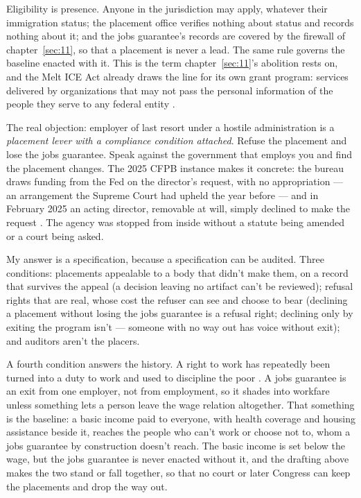 Eligibility is presence. Anyone in the jurisdiction may apply, whatever their immigration status; the placement office verifies nothing about status and records nothing about it; and the jobs guarantee's records are covered by the firewall of chapter~\ref{sec:11}, so that a placement is never a lead. The same rule governs the baseline enacted with it. This is the term chapter~\ref{sec:11}'s abolition rests on, and the Melt ICE Act already draws the line for its own grant program: services delivered by organizations that may not pass the personal information of the people they serve to any federal entity \autocite{hr7190}.

The real objection: employer of last resort under a hostile administration is a \emph{placement lever with a compliance condition attached}. Refuse the placement and lose the jobs guarantee. Speak against the government that employs you and find the placement changes. The 2025 CFPB instance makes it concrete: the bureau draws funding from the Fed on the director's request, with no appropriation — an arrangement the Supreme Court had upheld the year before \autocite{cfpb2024cfsa} — and in February 2025 an acting director, removable at will, simply declined to make the request \autocite{kolodziej2025cfpb}. The agency was stopped from inside without a statute being amended or a court being asked.

My answer is a specification, because a specification can be audited. Three conditions: placements appealable to a body that didn't make them, on a record that survives the appeal (a decision leaving no artifact can't be reviewed); refusal rights that are real, whose cost the refuser can see and choose to bear (declining a placement without losing the jobs guarantee is a refusal right; declining only by exiting the program isn't — someone with no way out has voice without exit); and auditors aren't the placers.

A fourth condition answers the history. A right to work has repeatedly been turned into a duty to work and used to discipline the poor \autocite{anderson2023hijacked}. A jobs guarantee is an exit from one employer, not from employment, so it shades into workfare unless something lets a person leave the wage relation altogether. That something is the baseline: a basic income paid to everyone, with health coverage and housing assistance beside it, reaches the people who can't work or choose not to, whom a jobs guarantee by construction doesn't reach. The basic income is set below the wage, but the jobs guarantee is never enacted without it, and the drafting above makes the two stand or fall together, so that no court or later Congress can keep the placements and drop the way out.

